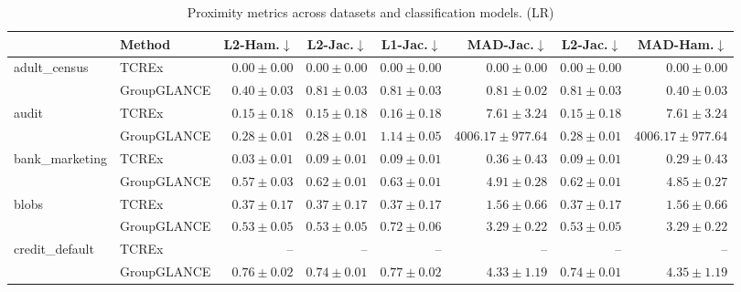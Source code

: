 \begin{table}[ht]
\centering
\caption{Proximity metrics across datasets and classification models. (LR)}
\label{tab:proximity_metrics_multinomiallogisticregression}
\begin{center}
\begin{sc}
\begin{scriptsize}
\begin{tabular}{l|l|rrrrrr}
\toprule
 & Method & L2-Ham.$\downarrow$ & L2-Jac.$\downarrow$ & L1-Jac.$\downarrow$ & MAD-Jac.$\downarrow$ & L2-Jac.$\downarrow$ & MAD-Ham.$\downarrow$ \\
\midrule
\multirow{2}{*}{adult\_census} & TCREx & $\boldsymbol{0.00\pm{0.00}}$ & $\boldsymbol{0.00\pm{0.00}}$ & $\boldsymbol{0.00\pm{0.00}}$ & $\boldsymbol{0.00\pm{0.00}}$ & $\boldsymbol{0.00\pm{0.00}}$ & $\boldsymbol{0.00\pm{0.00}}$ \\
 & GroupGLANCE & $0.40\pm{0.03}$ & $0.81\pm{0.03}$ & $0.81\pm{0.03}$ & $0.81\pm{0.02}$ & $0.81\pm{0.03}$ & $0.40\pm{0.03}$ \\
\midrule
\multirow{2}{*}{audit} & TCREx & $\boldsymbol{0.15\pm{0.18}}$ & $\boldsymbol{0.15\pm{0.18}}$ & $\boldsymbol{0.16\pm{0.18}}$ & $\boldsymbol{7.61\pm{3.24}}$ & $\boldsymbol{0.15\pm{0.18}}$ & $\boldsymbol{7.61\pm{3.24}}$ \\
 & GroupGLANCE & $0.28\pm{0.01}$ & $0.28\pm{0.01}$ & $1.14\pm{0.05}$ & $4006.17\pm{977.64}$ & $0.28\pm{0.01}$ & $4006.17\pm{977.64}$ \\
\midrule
\multirow{2}{*}{bank\_marketing} & TCREx & $\boldsymbol{0.03\pm{0.01}}$ & $\boldsymbol{0.09\pm{0.01}}$ & $\boldsymbol{0.09\pm{0.01}}$ & $\boldsymbol{0.36\pm{0.43}}$ & $\boldsymbol{0.09\pm{0.01}}$ & $\boldsymbol{0.29\pm{0.43}}$ \\
 & GroupGLANCE & $0.57\pm{0.03}$ & $0.62\pm{0.01}$ & $0.63\pm{0.01}$ & $4.91\pm{0.28}$ & $0.62\pm{0.01}$ & $4.85\pm{0.27}$ \\
\midrule
\multirow{2}{*}{blobs} & TCREx & $\boldsymbol{0.37\pm{0.17}}$ & $\boldsymbol{0.37\pm{0.17}}$ & $\boldsymbol{0.37\pm{0.17}}$ & $\boldsymbol{1.56\pm{0.66}}$ & $\boldsymbol{0.37\pm{0.17}}$ & $\boldsymbol{1.56\pm{0.66}}$ \\
 & GroupGLANCE & $0.53\pm{0.05}$ & $0.53\pm{0.05}$ & $0.72\pm{0.06}$ & $3.29\pm{0.22}$ & $0.53\pm{0.05}$ & $3.29\pm{0.22}$ \\
\midrule
\multirow{2}{*}{credit\_default} & TCREx & -- & -- & -- & -- & -- & -- \\
 & GroupGLANCE & $\boldsymbol{0.76\pm{0.02}}$ & $\boldsymbol{0.74\pm{0.01}}$ & $\boldsymbol{0.77\pm{0.02}}$ & $\boldsymbol{4.33\pm{1.19}}$ & $\boldsymbol{0.74\pm{0.01}}$ & $\boldsymbol{4.35\pm{1.19}}$ \\

\end{tabular}
\end{scriptsize}
\end{sc}
\end{center}
\end{table}
